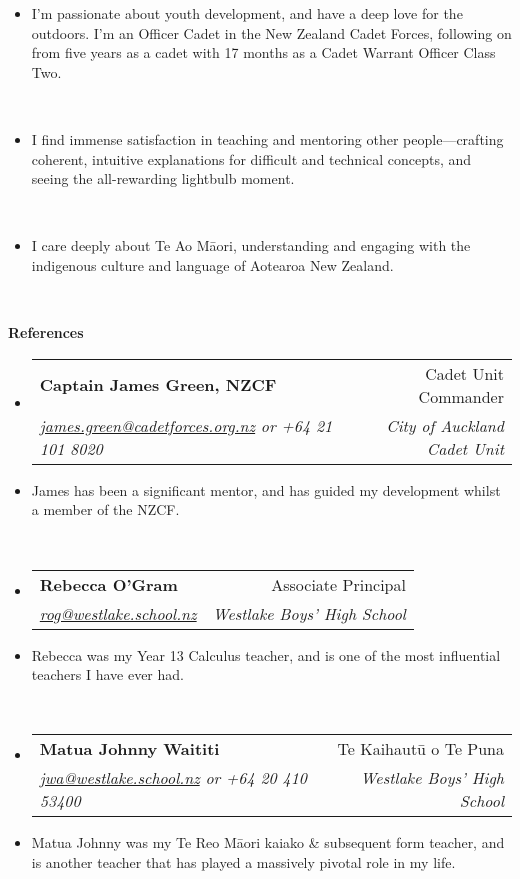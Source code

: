 \documentclass[11pt,a4paper]{article}[leftmargin=*]
\makeatletter
\def \entryspacing {-0pt}
\renewcommand{\section}[2]{\vspace{5pt}
  \colorbox{secondary}{\color{white}\raggedbottom\normalsize\textbf{{#1}{\hspace{7pt}#2}}}
}
\newcommand{\resumeEntryStart}{\begin{itemize}[leftmargin=2.5mm]}
\newcommand{\resumeEntryEnd}{\end{itemize}\vspace{\entryspacing}}
\newcommand{\resumeEntryTSDL}[4]{
  \vspace{-1pt}\item[]
    \begin{tabularx}{0.97\textwidth}{X@{\hspace{60pt}}r}
      \textbf{\color{primary}#1} & {\firabook\color{accent}\small#2} \\
      \textit{\color{accent}\small#3} & \textit{\color{accent}\small#4} \\
    \end{tabularx}\vspace{-6pt}
}
\newcommand{\resumeEntryP}[1]{
  \item[]\small{
    #1 \vspace{-6pt}
  }\\
}
\makeatother
\begin{document}
\resumeEntryStart
\resumeEntryP{
	I'm passionate about youth development, and have a deep love for the outdoors. I'm an Officer Cadet in the New Zealand Cadet Forces, following on from five years as a cadet with 17 months as a Cadet Warrant Officer Class Two.
}

\resumeEntryP{
	I find immense satisfaction in teaching and mentoring other people—crafting coherent, intuitive explanations for difficult and technical concepts, and seeing the all-rewarding lightbulb moment.
}

\resumeEntryP{
	I care deeply about Te Ao Māori, understanding and engaging with the indigenous culture and language of Aotearoa New Zealand.
}
\resumeEntryEnd


\section{\faUserCheck}{References}

\resumeEntryStart
\resumeEntryTSDL
{Captain James Green, NZCF}{Cadet Unit Commander}
{\href{mailto:james.green@cadetforces.org.nz}{james.green@cadetforces.org.nz} or +64 21 101 8020}{City of Auckland Cadet Unit}

\resumeEntryP{
	James has been a significant mentor, and has guided my development whilst a member of the NZCF.
}
\resumeEntryEnd

\resumeEntryStart
\resumeEntryTSDL
{Rebecca O’Gram}{Associate Principal}
{\href{mailto:rog@westlake.school.nz}{rog@westlake.school.nz}}{Westlake Boys’ High School}

\resumeEntryP{
	Rebecca was my Year 13 Calculus teacher, and is one of the most influential teachers I have ever had.
}
\resumeEntryEnd

\resumeEntryStart
\resumeEntryTSDL
{Matua Johnny Waititi}{Te Kaihautū o Te Puna}
{\href{mailto:jwa@westlake.school.nz}{jwa@westlake.school.nz} or +64 20 410 53400}{Westlake Boys’ High School}

\resumeEntryP{
	Matua Johnny was my Te Reo Māori kaiako \& subsequent form teacher, and is another teacher that has played a massively pivotal role in my life.
}
\resumeEntryEnd
\end{document}
